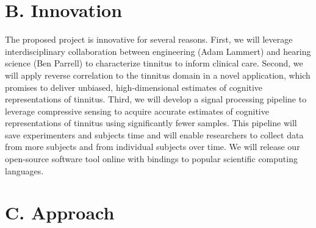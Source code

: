 \documentclass[11pt, notitlepage]{article} %
\begin{document}

\section*{B. Innovation}

The proposed project is innovative for several reasons.
First, we will leverage interdisciplinary collaboration between engineering (Adam Lammert)
and hearing science (Ben Parrell) to characterize tinnitus to inform clinical care.
Second, we will apply reverse correlation to the tinnitus domain in a novel application,
which promises to deliver unbiased, high-dimensional estimates of cognitive representations of tinnitus.
Third, we will develop a signal processing pipeline to leverage compressive sensing
to acquire accurate estimates of cognitive representations of tinnitus using significantly fewer samples.
This pipeline will save experimenters and subjects time and will enable researchers
to collect data from more subjects and from individual subjects over time.
We will release our open-source software tool online with bindings to popular scientific computing languages.


\section*{C. Approach}
\end{document}

